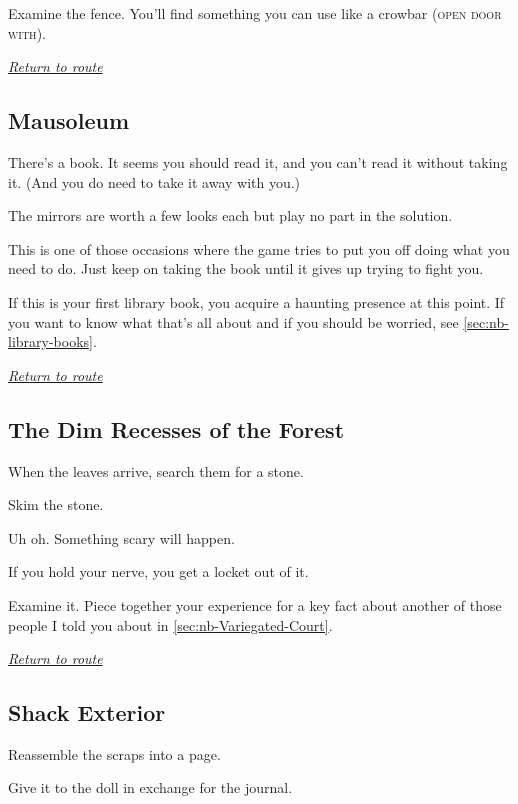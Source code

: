 \documentclass[a5paper]{extarticle}
\begin{document}
Examine the fence. You'll find something you can use like a crowbar (\textsc{open door with}).

\hyperref[sec:route]{\emph{Return to route}}

\newpage
\subsection{Mausoleum}\label{sec:sol-Mausoleum}

There's a book. It seems you should read it, and you can't read it without taking it.
(And you do need to take it away with you.)

The mirrors are worth a few looks each but play no part in the solution.

This is one of those occasions where the game tries to put you off doing what you need to do.
Just keep on taking the book until it gives up trying to fight you.

If this is your first library book, you acquire a haunting presence at this point.
If you want to know what that's all about and if you should be worried,
see \cref{sec:nb-library-books}.

\hyperref[sec:route]{\emph{Return to route}}

\newpage
\subsection{The Dim Recesses of the Forest}\label{sec:sol-The-Dim-Recesses-of-the-Forest}

When the leaves arrive, search them for a stone.

Skim the stone.

Uh oh. Something scary will happen.

If you hold your nerve, you get a locket out of it.

Examine it. Piece together your experience for a key fact about another of those
people I told you about in \cref{sec:nb-Variegated-Court}.

\hyperref[sec:route-1]{\emph{Return to route}}

\newpage
\subsection{Shack Exterior}\label{sec:sol-Shack-Exterior-0}

Reassemble the scraps into a page.

Give it to the doll in exchange for the journal.
\end{document}
